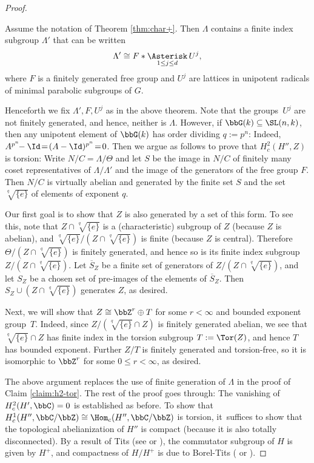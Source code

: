 \begin{proof}
\begin{thm}\label{thm:lubotzky-char+}
Assume the notation of Theorem \ref{thm:char+}. Then $\Lambda$ contains a finite index subgroup $\Lambda'$ that can be written
\[
\Lambda' \cong F \ast \mathop{\Asterisk}_{1\leq j\leq d} U^j,
\]
where $F$ is a finitely generated free group and $U^j$ are lattices in unipotent radicals of minimal parabolic subgroups of $G$.
\end{thm}

Henceforth we fix $\Lambda', F, U^j$ as in the above theorem. Note that the groups~$U^j$ are not finitely generated, and hence, neither is $\Lambda$. However, if $\bbG(k)\subseteq \SL(n,k)$, then any unipotent element of $\bbG(k)$ has order dividing $q\!:=\!p^n$: Indeed, \hbox{$A^{p^n}\!\!-\Id \!=\! (A-\Id)^{p^n}\!=\!0$}. Then we argue as follows to prove that $H^2_c(H'',Z)$ is torsion: Write $N/C=\Lambda/\Theta$ and let $S$ be the image in $N/C$ of finitely many coset representatives of $\Lambda/\Lambda'$ and the image of the generators of the free group $F$. Then $N/C$ is virtually abelian and generated by the finite set $S$ and the set $\sqrt[q]{\{e\}}$ of elements of exponent $q$.

Our first goal is to show that $Z$ is also generated by a set of this form. To see this, note that $Z\cap \sqrt[q]{\{e\}}$ is a (characteristic) subgroup of $Z$ (because $Z$ is abelian), and $\sqrt[q]{\{e\}}/(Z\cap \sqrt[q]{\{e\}})$ is finite (because $Z$ is central). Therefore $\Theta/(Z\cap \sqrt[q]{\{e\}})$ is finitely generated, and hence so is its finite index subgroup $Z/(Z\cap \sqrt[q]{\{e\}})$. Let $\overline{S}_Z$ be a finite set of generators of $Z/(Z\cap \sqrt[q]{\{e\}})$, and let $S_Z$ be a chosen set of pre-images of the elements of $\overline{S}_Z$. Then $S_Z\cup (Z\cap \sqrt[q]{\{e\}})$ generates $Z$, as desired.

Next, we will show that $Z\cong \bbZ^r\oplus T$ for some $r<\infty$ and bounded exponent group~$T$. Indeed, since $Z/(\sqrt[q]{\{e\}}\cap Z)$ is finitely generated abelian, we see that $\sqrt[q]{\{e\}}\cap Z$ has finite index in the torsion subgroup $T:=\Tor(Z)$, and hence $T$ has bounded exponent. Further $Z/T$ is finitely generated and torsion-free, so it is isomorphic to $\bbZ^r$ for some $0\leq r<\infty$, as desired.

The above argument replaces the use of finite generation of $\Lambda$ in the proof of Claim \ref{claim:h2-tor}. The rest of the proof goes through: The vanishing of $H^2_c(H',\bbC)=0$ is established as before. To show that $H^1_c(H'',\bbC/\bbZ)\cong \Hom_c(H'',\bbC/\bbZ)$ is torsion, it~suffices to show that the topological abelianization of $H''$ is compact (because it is also totally disconnected). By a result of Tits (see \cite{tits-simple} or \cite[Th.\,I.1.5.6(ii)]{margulis-book}), the commutator subgroup of $H$ is given by $H^+$, and compactness of $H/H^+$ is due to Borel-Tits (\cite[6.14]{borel-tits-morphismes-abstraits} or \cite[I.2.3.1(b)]{margulis-book}).


\end{proof}
